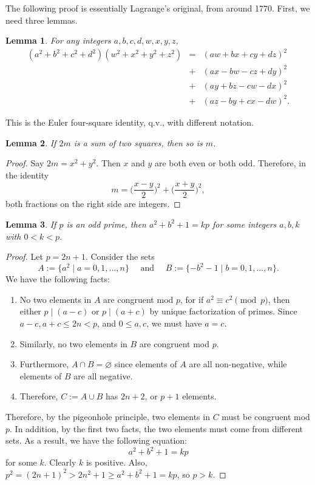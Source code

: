 \documentclass[12pt]{article}
\newtheorem{lem}{Lemma}
\begin{document}

The following proof is essentially Lagrange's original, from around 1770.  First, we need three lemmas.

\begin{lem} For any integers $a,b,c,d,w,x,y,z$, 
\begin{eqnarray*}
(a^2+b^2+c^2+d^2)(w^2+x^2+y^2+z^2) & = & (aw+bx+cy+dz)^2 \\
& + & (ax-bw-cz+dy)^2 \\
& + & (ay+bz-cw-dx)^2 \\
& + & (az-by+cx-dw)^2.
\end{eqnarray*}
\end{lem}
This is the Euler four-square identity, q.v., with different notation.

\begin{lem} If $2m$ is a sum of two squares, then so is $m$.\end{lem}

\begin{proof} Say $2m=x^2+y^2$. Then $x$ and $y$ are both even or both odd.
Therefore, in the identity $$m=\Big(\frac{x-y}{2}\Big)^2 +
\Big(\frac{x+y}{2}\Big)^2,$$
both fractions on the right side are integers. \end{proof}

\begin{lem} If $p$ is an odd prime,
then $a^2+b^2+1=kp$ for some integers $a,b,k$ with $0<k<p$. \end{lem}

\begin{proof} Let $p = 2n + 1$.  Consider the sets $$A:=\lbrace a^2 \mid a=0,1,...,n\rbrace\quad\mbox{ and }\quad B:=\lbrace -b^2-1 \mid b=0,1,...,n \rbrace.$$  We have the following facts:
\begin{enumerate}
\item No two elements in $A$ are congruent mod $p$, for if $a^2\equiv c^2 \pmod p$, then either $p\mid (a-c)$ or $p\mid (a+c)$ by unique factorization of primes.  Since $a-c, a+c \le 2n< p$, and $0\le a,c$, we must have $a=c$.  
\item Similarly, no two elements in $B$ are congruent mod $p$.  
\item Furthermore, $A\cap B=\varnothing$ since elements of $A$ are all non-negative, while elements of $B$ are all negative.
\item Therefore, $C:=A\cup B$ has $2n+2$, or $p+1$ elements.
\end{enumerate}
Therefore, by the pigeonhole principle, two elements in $C$ must be congruent mod $p$.  In addition, by the first two facts, the two elements must come from different sets.  As a result, we have the following equation: $$a^2+b^2+1=kp$$
for some $k$. Clearly $k$ is positive. Also, $p^2 = (2n + 1)^2 > 2n^2 + 1 \ge a^2+b^2+1 = kp$, so $p > k$.
\end{proof}
\end{document}
